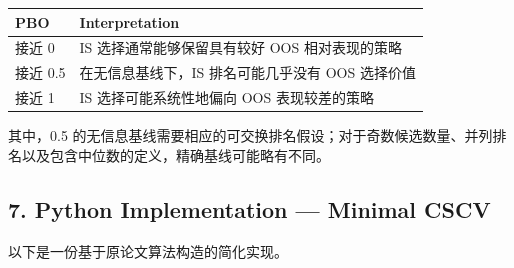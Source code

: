 \begin{readertable}
\begin{longtable}[]{@{}
  >{\raggedleft\arraybackslash}p{}
  >{\raggedright\arraybackslash}p{}@{}}
\toprule
PBO & Interpretation \\
\midrule
\endhead
接近 0 & IS 选择通常能够保留具有较好 OOS 相对表现的策略 \\
接近 0.5 & 在无信息基线下，IS 排名可能几乎没有 OOS 选择价值 \\
接近 1 & IS 选择可能系统性地偏向 OOS 表现较差的策略 \\
\bottomrule
\end{longtable}
\end{readertable}

其中，0.5 的无信息基线需要相应的可交换排名假设；对于奇数候选数量、并列排名以及包含中位数的定义，精确基线可能略有不同。

\hypertarget{part-4-71-0001-python-implementation-minimal-cscv}{%
\subsection{7. Python Implementation --- Minimal CSCV}\label{part-4-71-0001-python-implementation-minimal-cscv}}

以下是一份基于原论文算法构造的简化实现。

